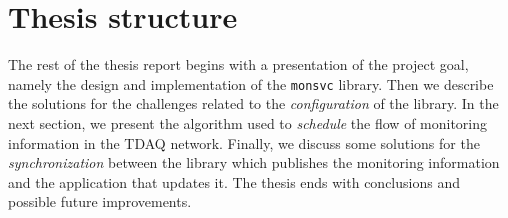 \section*{Thesis structure}

The rest of the thesis report begins with a presentation of the project goal, namely the design and implementation of the {\tt monsvc} library. Then we describe the solutions for the challenges related to the \emph{configuration} of the library. In the next section, we present the algorithm used to \emph{schedule} the flow of monitoring information in the TDAQ network. Finally, we discuss some solutions for the \emph{synchronization} between the library which publishes the monitoring information and the application that updates it. The thesis ends with conclusions and possible future improvements.

